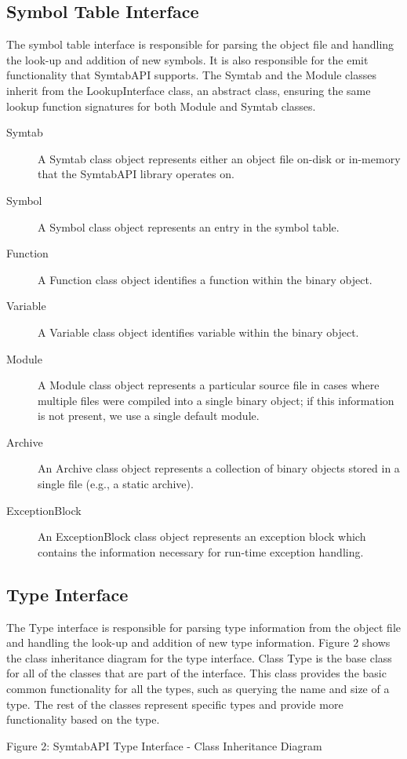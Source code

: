 \subsection{Symbol Table Interface}
The symbol table interface is responsible for parsing the object file and handling the look-up and addition of new symbols. It is also responsible for the emit functionality that SymtabAPI supports. The Symtab and the Module classes inherit from the LookupInterface class, an abstract class, ensuring the same lookup function signatures for both Module and Symtab classes. 
\begin{description}
\item[Symtab] A Symtab class object represents either an object file on-disk or in-memory that the SymtabAPI library operates on.
\item[Symbol] A Symbol class object represents an entry in the symbol table.
\item[Function] A Function class object identifies a function within the binary object.
\item[Variable] A Variable class object identifies variable within the binary object.
\item[Module] A Module class object represents a particular source file in cases where multiple files were compiled into a single binary object; if this information is not present, we use a single default module.
\item[Archive] An Archive class object represents a collection of binary objects stored in a single file (e.g., a static archive). 
\item[ExceptionBlock] An ExceptionBlock class object represents an exception block which contains the information necessary for run-time exception handling.
\end{description}
\subsection{Type Interface}
 The Type interface is responsible for parsing type information from the object file and handling the look-up and addition of new type information. Figure 2 shows the class inheritance diagram for the type interface. Class Type is the base class for all of the classes that are part of the interface. This class provides the basic common functionality for all the types, such as querying the name and size of a type. The rest of the classes represent specific types and provide more functionality based on the type. 

Figure 2: SymtabAPI Type Interface - Class Inheritance Diagram

